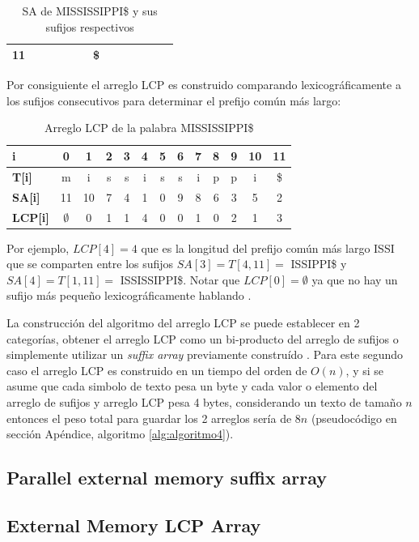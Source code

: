 \begin{table}[h]
\begin{tabular}{|l|l|l|l|l|l|l|l|l|l|l|l|l|}
\textbf{11}                                                      &                         &                         &                        &                        &                        & \$                      &                        &                        &                        &                        &                         &                         \\ \hline
\end{tabular}
\caption{SA de MISSISSIPPI\$ y sus sufijos respectivos}
\end{table}

Por consiguiente el arreglo LCP es construido comparando lexicográficamente a los sufijos consecutivos para determinar el prefijo común más largo:

\begin{table}[h]
\centering
\label{my-label11}
\begin{tabular}{|l|c|c|c|c|c|c|c|c|c|c|c|c|}
\hline
\textbf{i}         & 0  & 1  & 2 & 3 & 4 & 5 & 6 & 7 & 8 & 9 & 10 & 11 \\ \hline
\textbf{T{[}i{]}}  & m  & i  & s & s & i & s & s & i & p & p & i  & \$  \\ \hline
\textbf{SA{[}i{]}} & 11 & 10 & 7 & 4 & 1 & 0 & 9 & 8 & 6 & 3 & 5  & 2  \\ \hline
\textbf{LCP{[}i{]}} & $\emptyset$  & 0  & 1 & 1 & 4 & 0 & 0 & 1 & 0 & 2 & 1  & 3  \\ \hline
\end{tabular}
\caption{Arreglo LCP de la palabra MISSISSIPPI\$}
\end{table}

Por ejemplo, $LCP[4] = 4$ que es la longitud del prefijo común más largo ISSI que se comparten entre los sufijos $SA[3] = T[4,11] =$ ISSIPPI\$ y $SA[4] = T[1,11] =$ ISSISSIPPI\$. Notar que $LCP[0] = \emptyset$ ya que no hay un sufijo más pequeño lexicográficamente hablando \cite{lcparray}.

La construcción del algoritmo del arreglo LCP se puede establecer en 2 categorías, obtener el arreglo LCP como un bi-producto del arreglo de sufijos \cite{suffixarray1} o simplemente utilizar un \textit{suffix array} previamente construído \cite{kasai}. Para este segundo caso el arreglo LCP es construido en un tiempo del orden de $O(n)$, y si se asume que cada simbolo de texto pesa un byte y cada valor o elemento del arreglo de sufijos y arreglo LCP pesa 4 bytes, considerando un texto de tamaño $n$ entonces el peso total para guardar los 2 arreglos sería de $8n$ (pseudocódigo en sección Apéndice, algoritmo \ref{alg:algoritmo4}).

\subsection{Parallel external memory suffix array}

\subsection{External Memory LCP Array}
